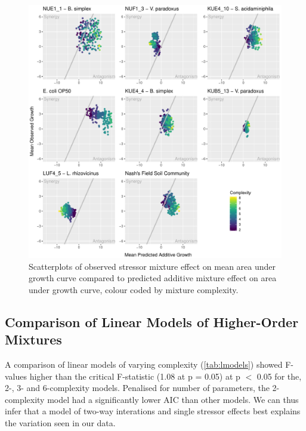 \documentclass[final,1p,times]{elsarticle}
\begin{document}
\begin{figure}[H]
    \centering
    \includegraphics[width = \textwidth]{Scripts/Results/Final_Pipeline/ObservedXPredicted.pdf}
    \caption{Scatterplots of observed stressor mixture effect on mean area under growth curve compared to predicted additive mixture effect on area under growth curve, colour coded by mixture complexity.}
    \label{fig:obsXpred}
\end{figure}

\newpage
\subsection{Comparison of Linear Models of Higher-Order Mixtures}
\label{S:3:6}

A comparison of linear models of varying complexity (\cref{tab:lmodels}) showed F-values higher than the critical F-statistic (1.08 at p = 0.05) at p $<$ 0.05 for the, 2-, 3- and 6-complexity models. Penalised for number of parameters, the 2-complexity model had a significantly lower AIC than other models. We can thus infer that a model of two-way interations and single stressor effects best explains the variation seen in our data.
\end{document}
